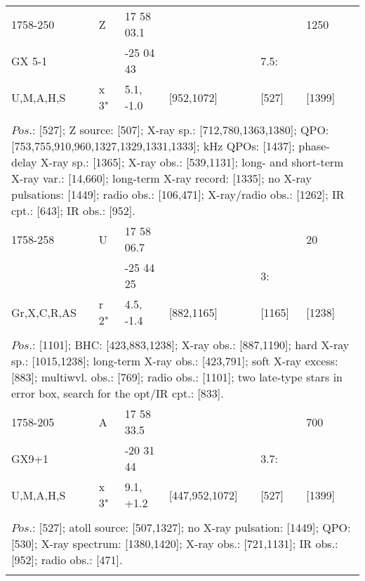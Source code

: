\documentclass{aa}
\begin{document}
\begin{tabular}{p{2.5cm}p{1cm}p{1.8cm}p{2.3cm}p{3.3cm}p{2.0cm}p{2.2cm}}
\noalign{\smallskip}
1758-250           & Z                 & 17 58 03.1           &                              &                           & 1250                &       \\
GX 5-1               &                     & -25 04 43             &                              & 7.5:                    &                          &      \\
U,M,A,H,S         & x 3"            & 5.1, -1.0                & [952,1072]          & [527]                 & [1399]              &   \\
\\ 

\multicolumn{7}{p{17.5cm}}{
$Pos$.: [527]; Z source: [507]; X-ray sp.: [712,780,1363,1380]; QPO: [753,755,910,960,1327,1329,1331,1333]; kHz QPOs: 
[1437]; phase-delay X-ray sp.: [1365]; X-ray obs.: [539,1131]; long- and short-term X-ray var.: [14,660]; long-term X-ray 
record: [1335]; no X-ray pulsations: [1449]; radio obs.: [106,471]; X-ray/radio obs.: [1262]; IR cpt.: [643]; IR obs.: [952].}\\
\noalign{\smallskip}
\hline

\noalign{\smallskip}
1758-258         & U                & 17 58 06.7           &                          &                         & 20                 &       \\
                          &                    & -25 44 25             &                          & 3:                     &                      &      \\
Gr,X,C,R,AS   & r 2"            & 4.5, -1.4                & [882,1165]     & [1165]             & [1238]          &       \\
\\
\multicolumn{7}{p{17.5cm}}{
$Pos$.: [1101]; BHC: [423,883,1238]; X-ray obs.: [887,1190]; hard X-ray sp.: [1015,1238]; long-term X-ray obs.: 
[423,791]; soft X-ray excess: [883]; multiwvl. obs.: [769]; radio obs.: [1101]; two late-type stars in error box, 
search for the opt/IR cpt.: [833].}\\
\noalign{\smallskip}
\hline

\noalign{\smallskip}
1758-205             & A              & 17 58 33.5            &                                &                              & 700            &               \\
GX9+1                 &                   & -20 31 44             &                                &  3.7:                      &                    &               \\
U,M,A,H,S           & x 3"          & 9.1, +1.2               & [447,952,1072]    & [527]                    & [1399]        &              \\
\\
\multicolumn{7}{p{17.5cm}}{
$Pos$.: [527]; atoll source: [507,1327]; no X-ray pulsation: [1449]; QPO: [530]; X-ray spectrum: [1380,1420]; X-ray
obs.: [721,1131]; IR obs.: [952]; radio obs.: [471].}\\
\noalign{\smallskip}
\hline


\end{tabular}
\end{document}
